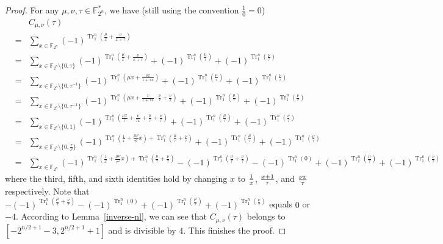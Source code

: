 \documentclass{article}
\newcommand{\F}{\mathbb{F}}
\newcommand{\0}{\textbf{0}}
\newcommand{\1}{\textbf{1}}
\newcommand{\TrN}{\operatorname{Tr}_1^n}
\theoremstyle{plain}
\newtheorem{lemma}{Lemma}
\theoremstyle{nonumberplain}
\begin{document}
    \begin{proof} 
    For any $\mu,\nu,\tau\in\F_{2^n}^*$,
    we have (still using the convention $\frac 10=0$)
    \begin{eqnarray*}
    &&C_{{\mu,\nu}}(\tau)\\
    &=&\sum_{x\in\F_{2^n}}(-1)^{\TrN(\frac{\mu}{x}+\frac{\nu}{x+\tau})}\\
    &=&\sum_{x\in\F_{2^n}\setminus\{0,\tau\}}(-1)^{\TrN(\frac{\mu}{x}+\frac{\nu}{x+\tau})}+(-1)^{\TrN(\frac{\mu}{\tau})}+(-1)^{\TrN(\frac{\nu}{\tau})}\\
    &=&\sum_{x\in\F_{2^n}\setminus\{0,\tau^{-1}\}}(-1)^{\TrN(\mu x+\frac{\nu x}{1+\tau x})}+(-1)^{\TrN(\frac{\mu}{\tau})}+(-1)^{\TrN(\frac{\nu}{\tau})}\\
    &=&\sum_{x\in\F_{2^n}\setminus\{0,\tau^{-1}\}}(-1)^{\TrN(\mu x+\frac{1}{1+\tau x}\cdot\frac{\nu}{\tau}+\frac{\nu}{\tau})}+(-1)^{\TrN(\frac{\mu}{\tau})}+(-1)^{\TrN(\frac{\nu}{\tau})}\\
    &=&\sum_{x\in\F_{2^n}\setminus\{0,1\}}(-1)^{\TrN(\frac{\mu x}{\tau}+\frac{\nu}{\tau x}+\frac{\mu}{\tau}+\frac{\nu}{\tau})}+(-1)^{\TrN(\frac{\mu}{\tau})}+(-1)^{\TrN(\frac{\nu}{\tau})}\\
    &=&\sum_{x\in\F_{2^n}\setminus\{0,\frac{\tau}{\nu}\}}(-1)^{\TrN(\frac{1}{x}+\frac{\mu \nu}{\tau^2}x)+\TrN(\frac{\mu}{\tau}+\frac{\nu}{\tau})}+(-1)^{\TrN(\frac{\mu}{\tau})}+(-1)^{\TrN(\frac{\nu}{\tau})}\\
    &=&\sum_{x\in\F_{2^n}}(-1)^{\TrN(\frac{1}{x}+\frac{\mu \nu}{\tau^2}x)+\TrN(\frac{\mu}{\tau}+\frac{\nu}{\tau})}-
    (-1)^{\TrN(\frac{\mu}{\tau}+\frac{\nu}{\tau})}-(-1)^{\TrN(0)}+(-1)^{\TrN(\frac{\mu}{\tau})}+(-1)^{\TrN(\frac{\nu}{\tau})}
   \end{eqnarray*}
   where the third, fifth, and sixth identities hold by changing $x$ to ${1\over x}$, ${x+1\over \tau}$, and ${\nu x\over \tau}$ respectively.
   Note that $-(-1)^{\TrN(\frac{\mu}{\tau}+\frac{\nu}{\tau})}-(-1)^{\TrN(0)}+(-1)^{\TrN(\frac{\mu}{\tau})}+(-1)^{\TrN(\frac{\nu}{\tau})}$
   equals $0$ or $-4$. According to Lemma~\ref{inverse-nl}, we can see that $C_{{\mu,\nu}}(\tau)$ belongs to $[-2^{{n/2}+1}-3, 2^{{n/2}+1}+1]$ and is divisible by $4$.
   This finishes the proof.
   \end{proof}
\end{document}
